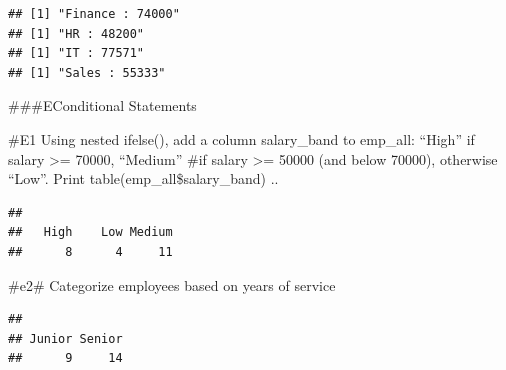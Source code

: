 \documentclass[
]{article}
\newenvironment{Shaded}{\begin{snugshade}}{\end{snugshade}}
\newcommand{\DecValTok}[1]{\textcolor[rgb]{0.00,0.00,0.81}{#1}}
\newcommand{\FunctionTok}[1]{\textcolor[rgb]{0.13,0.29,0.53}{\textbf{#1}}}
\newcommand{\NormalTok}[1]{#1}
\newcommand{\OtherTok}[1]{\textcolor[rgb]{0.56,0.35,0.01}{#1}}
\newcommand{\SpecialCharTok}[1]{\textcolor[rgb]{0.81,0.36,0.00}{\textbf{#1}}}
\newcommand{\StringTok}[1]{\textcolor[rgb]{0.31,0.60,0.02}{#1}}
\begin{document}
\begin{verbatim}
## [1] "Finance : 74000"
## [1] "HR : 48200"
## [1] "IT : 77571"
## [1] "Sales : 55333"
\end{verbatim}

\#\#\#EConditional Statements

\#E1 Using nested ifelse(), add a column salary\_band to emp\_all:
``High'' if salary \textgreater= 70000, ``Medium'' \#if salary
\textgreater= 50000 (and below 70000), otherwise ``Low''. Print
table(emp\_all\$salary\_band) ..

\begin{Shaded}
\end{Shaded}

\begin{verbatim}
## 
##   High    Low Medium 
##      8      4     11
\end{verbatim}

\#e2\# Categorize employees based on years of service

\begin{Shaded}
\end{Shaded}

\begin{verbatim}
## 
## Junior Senior 
##      9     14
\end{verbatim}
\end{document}
